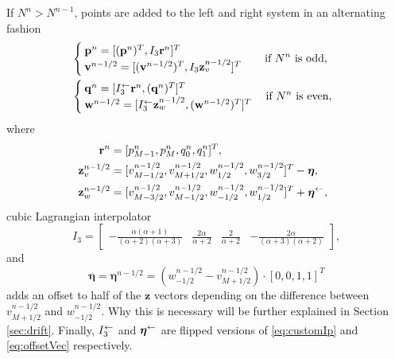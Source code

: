 If $N^n>N^{n-1}$, points are added to the left and right system in an alternating fashion %
\begin{equation}\label{eq:addingPoint}
    \begin{aligned}
        \!\!\!\!\!&\begin{cases}
            \mathbf{p}^n = [(\mathbf{p}^n)^T, I_3\mathbf{r}^n]^T\\
            \mathbf{v}^{n-1/2} = [(\mathbf{v}^{n-1/2})^T, I_3\mathbf{z}_v^{n-1/2}]^T
        \end{cases}
        \quad\!\text{if $N^n $ is odd},\\
        \!\!\!\!\!&\begin{cases}
            \mathbf{q}^n = [I_3^\flip\mathbf{r}^n, (\mathbf{q}^n)^T]^T\\
            \mathbf{w}^{n-1/2} = [ I_3^\flip\mathbf{z}_w^{n-1/2},(\mathbf{w}^{n-1/2})^T]^T
        \end{cases}\text{if $ N^n$ is even},
    \end{aligned}
\end{equation}
where
\begin{equation}\label{eq:interpVecs}
    \begin{aligned}
        \!\!\!\!\mathbf{r}^n &= [p_{M-1}^n, p_M^n, q_0^n, q_1^n]^T,\\
        \!\!\!\!\mathbf{z}_v^{n-1/2} &= [v_{M-1/2}^{n-1/2}, v_{M+1/2}^{n-1/2}, w_{1/2}^{n-1/2}, w_{3/2}^{n-1/2}]^T - \boldsymbol{\eta},\\
        \!\!\!\!\mathbf{z}_w^{n-1/2} &= [v_{M-3/2}^{n-1/2}, v_{M-1/2}^{n-1/2}, w_{-1/2}^{n-1/2}, w_{1/2}^{n-1/2}]^T+ \boldsymbol{\eta}^{\flip},%
    \end{aligned}
\end{equation}
cubic Lagrangian interpolator
\begin{equation}\label{eq:customIp}
    I_3 = \begin{bmatrix} -\frac{\alpha(\alpha+1)}{(\alpha+2)(\alpha+3)} &\frac{2\alpha}{\alpha+2} &\frac{2}{\alpha+2} 
    &-\frac{2\alpha}{(\alpha+3)(\alpha+2)}
    \end{bmatrix},
\end{equation}
and 
\begin{equation}\label{eq:offsetVec}
    \boldsymbol{\eta} = \boldsymbol{\eta}^{n-1/2}= \left(w_{-1/2}^{n-1/2}-v_{M+1/2}^{n
    -1/2}\right)\cdot[0, 0, 1, 1]^T 
\end{equation}
adds an offset to half of the $\mathbf{z}$ vectors depending on the difference between $v_{M+1/2}^{n-1/2}$ and $w_{-1/2}^{n-1/2}$. Why this is necessary will be further explained in Section \ref{sec:drift}. Finally, $I_3^\leftarrow$ and $\boldsymbol{\eta}^{\leftarrow}$ are flipped versions of \eqref{eq:customIp} and \eqref{eq:offsetVec} respectively.

